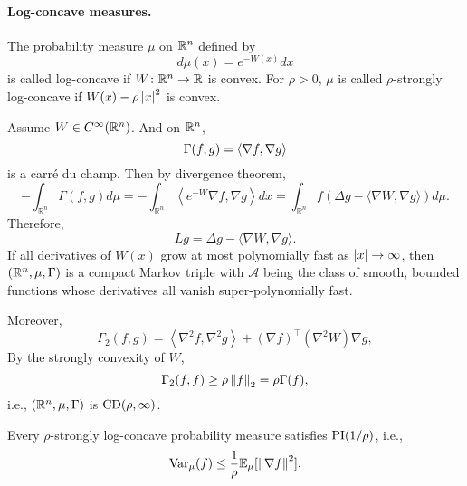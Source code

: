 \paragraph{Log-concave measures.}

\begin{defn}
    The probability measure $\mu$ on $\mathbb{R}^n$ defined by
    \begin{equation*}
    	d\mu(x) = e^{-W(x)}dx
    \end{equation*}
    is called log-concave if $W \colon \mathbb{R}^n \rightarrow \mathbb{R}$ is convex. For $\rho > 0$, $\mu$ is called $\rho$-strongly log-concave if $W(x) - \rho \left\lvert x\right\lvert^2$ is convex.
\end{defn}

Assume $W \in C^\infty(\mathbb{R}^n)$. And on $\mathbb{R}^n$,
\begin{equation*}
	\Gamma(f,g) = \left\langle \nabla f, \nabla g \right\rangle
\end{equation*}
is a carr\'e du champ. Then by divergence theorem,
\begin{equation*}
	-\int_{\mathbb{R}^n} \Gamma(f, g) d \mu=-\int_{\mathbb{R}^n}\left\langle e^{-W} \nabla f, \nabla g\right\rangle d x=\int_{\mathbb{R}^n} f(\Delta g-\langle\nabla W, \nabla g\rangle) d \mu.
\end{equation*}
Therefore,
\begin{equation*}
	L g=\Delta g-\langle\nabla W, \nabla g\rangle.
\end{equation*}
If all derivatives of $W(x)$ grow at most polynomially fast as $\left\lvert x\right\lvert \rightarrow \infty$, then $(\mathbb{R}^n,\mu,\Gamma)$ is a compact Markov triple with $\mathcal{A}$ being the class of smooth, bounded functions whose derivatives all vanish super-polynomially fast.

Moreover,
\begin{equation*}
	\Gamma_2(f, g)=\left\langle\nabla^2 f, \nabla^2 g\right\rangle+(\nabla f)^\top\left(\nabla^2 W\right)\nabla g,
\end{equation*}
By the strongly convexity of $W$,
\begin{equation*}
	\Gamma_2(f, f) \geq \rho \left\lVert f\right\lVert_2 = \rho \Gamma(f),
\end{equation*}
i.e., $(\mathbb{R}^n,\mu,\Gamma)$ is $\operatorname{CD}(\rho,\infty)$.

\begin{cor}
    Every $\rho$-strongly log-concave probability measure satisfies $\operatorname{PI}(1 / \rho)$, i.e.,
    \begin{equation*}
    	\operatorname{Var}_\mu(f) \leq \frac{1}{\rho} \mathbb{E}_\mu[\left\lVert\nabla f\right\lVert^2].
    \end{equation*}
\end{cor}


